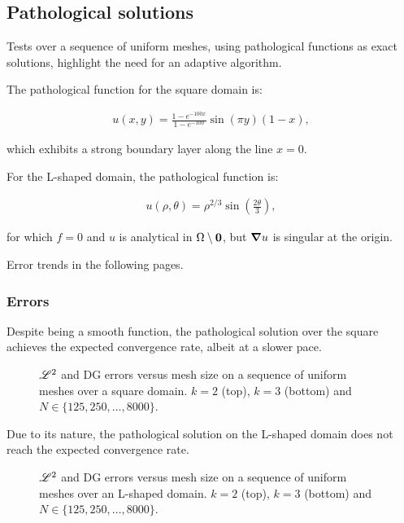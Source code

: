 \newpage
\subsection{Pathological solutions}

Tests over a sequence of uniform meshes, using pathological functions as exact solutions, highlight the need for an adaptive algorithm.

\cite{Antonietti2013} The pathological function for the square domain is:

\begin{gather} \label{pathological_square}
    u(x, y) = \frac{1 - e^{-100x}}{1 - e^{-100}} \sin(\pi y) (1 - x),
\end{gather}

which exhibits a strong boundary layer along the line $x = 0$.

For the L-shaped domain, the pathological function is:

\begin{gather} \label{pathological_lshape}
    u(\rho, \theta) = \rho^{2 / 3} \sin\left(\frac{2 \theta}{3}\right),
\end{gather}

for which $f = 0$ and $u$ is analytical in $\Omega \setminus \bm{0}$, but $\bm{\nabla}{u}$ is singular at the origin.

Error trends in the following pages.

\newpage
\subsubsection{Errors}

Despite being a smooth function, the pathological solution over the square achieves the expected convergence rate, albeit at a slower pace.

\begin{figure}[!ht]
    
    
    \caption{$\mathscr{L}^2$ and DG errors versus mesh size on a sequence of uniform meshes over a square domain. $k = 2$ (top), $k = 3$ (bottom) and $N \in \{125, 250, \dots, 8000\}$.}
\end{figure}

\newpage

Due to its nature, the pathological solution on the L-shaped domain does not reach the expected convergence rate.

\begin{figure}[!ht]
    
    
    \caption{$\mathscr{L}^2$ and DG errors versus mesh size on a sequence of uniform meshes over an L-shaped domain. $k = 2$ (top), $k = 3$ (bottom) and $N \in \{125, 250, \dots, 8000\}$.}
\end{figure}